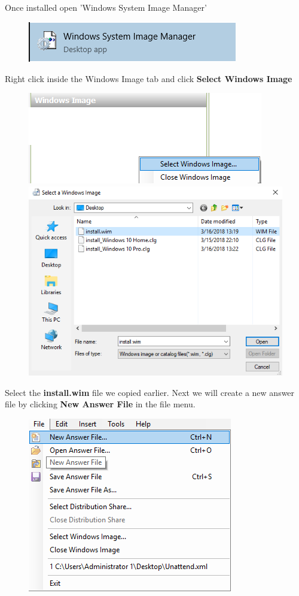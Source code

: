 \documentclass{article}
\begin{document}
\subsection{}
Once installed open 'Windows System Image Manager'
\begin{figure}[h]
	\includegraphics[width=.5\linewidth]{"sysprep/3-23-2018 13-21-27"}
\end{figure}
Right click inside the Windows Image tab and click \textbf{Select Windows Image}
\begin{figure}[h]
	\includegraphics[width=.5\linewidth]{"sysprep/3-23-2018 13-48-20"}
	\includegraphics[width=.5\linewidth]{"sysprep/3-23-2018 13-25-37"}
\end{figure}
\newline Select the \textbf{install.wim} file we copied earlier.
\newline Next we will create a new answer file by clicking \textbf{New Answer File} in the file menu.
\begin{figure}[h]
	\centering
	\includegraphics[width=.5\linewidth]{"sysprep/3-23-2018 13-26-37"}
\end{figure}
\end{document}
